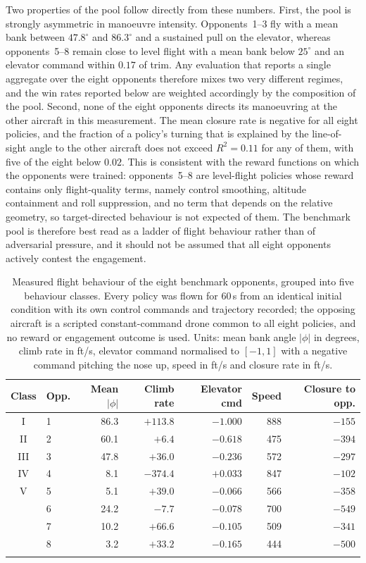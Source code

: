 \documentclass[pdflatex,sn-mathphys-num]{sn-jnl}%
\theoremstyle{thmstyleone}%
\theoremstyle{thmstyletwo}%
\theoremstyle{thmstylethree}%
\begin{document}
Two properties of the pool follow directly from these numbers. First, the pool is strongly asymmetric in manoeuvre intensity. Opponents~1--3 fly with a mean bank between $47.8^{\circ}$ and $86.3^{\circ}$ and a sustained pull on the elevator, whereas opponents~5--8 remain close to level flight with a mean bank below $25^{\circ}$ and an elevator command within $0.17$ of trim. Any evaluation that reports a single aggregate over the eight opponents therefore mixes two very different regimes, and the win rates reported below are weighted accordingly by the composition of the pool. Second, none of the eight opponents directs its manoeuvring at the other aircraft in this measurement. The mean closure rate is negative for all eight policies, and the fraction of a policy's turning that is explained by the line-of-sight angle to the other aircraft does not exceed $R^{2}=0.11$ for any of them, with five of the eight below $0.02$. This is consistent with the reward functions on which the opponents were trained: opponents~5--8 are level-flight policies whose reward contains only flight-quality terms, namely control smoothing, altitude containment and roll suppression, and no term that depends on the relative geometry, so target-directed behaviour is not expected of them. The benchmark pool is therefore best read as a ladder of flight behaviour rather than of adversarial pressure, and it should not be assumed that all eight opponents actively contest the engagement.

\begin{table}[h]
\caption{Measured flight behaviour of the eight benchmark opponents, grouped into five behaviour classes. Every policy was flown for $60$\,s from an identical initial condition with its own control commands and trajectory recorded; the opposing aircraft is a scripted constant-command drone common to all eight policies, and no reward or engagement outcome is used. Units: mean bank angle $|\phi|$ in degrees, climb rate in ft/s, elevator command normalised to $[-1,1]$ with a negative command pitching the nose up, speed in ft/s and closure rate in ft/s.}\label{tab:bench_behaviour}
\small
\begin{tabular*}{\textwidth}{@{\extracolsep\fill}clrrrrr}
\toprule
Class & Opp. & Mean $|\phi|$ & Climb rate & Elevator cmd & Speed & Closure to opp. \\
\midrule
I   & 1 & 86.3 & $+113.8$ & $-1.000$ & 888 & $-155$ \\
\midrule
II  & 2 & 60.1 & $+6.4$   & $-0.618$ & 475 & $-394$ \\
\midrule
III & 3 & 47.8 & $+36.0$  & $-0.236$ & 572 & $-297$ \\
\midrule
IV  & 4 & 8.1  & $-374.4$ & $+0.033$ & 847 & $-102$ \\
\midrule
V   & 5 & 5.1  & $+39.0$  & $-0.066$ & 566 & $-358$ \\
    & 6 & 24.2 & $-7.7$   & $-0.078$ & 700 & $-549$ \\
    & 7 & 10.2 & $+66.6$  & $-0.105$ & 509 & $-341$ \\
    & 8 & 3.2  & $+33.2$  & $-0.165$ & 444 & $-500$ \\
\botrule
\end{tabular*}
\end{table}
\end{document}
